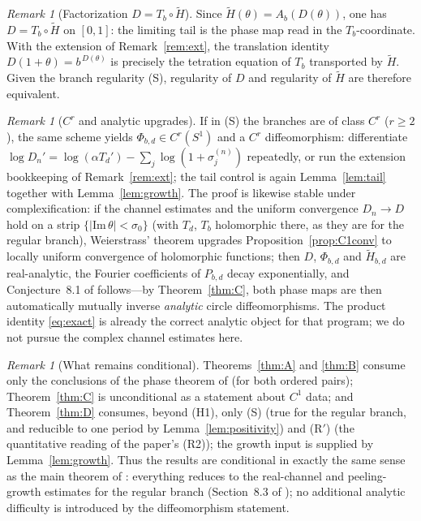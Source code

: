 \documentclass[11pt]{article}
\theoremstyle{definition}
\theoremstyle{remark}
\newtheorem{remark}[theorem]{Remark}
\newcommand{\Sone}{S^{1}}
\newcommand{\Ab}{A_{b}}
\newcommand{\Tb}{T_{b}}
\newcommand{\Td}{T_{d}}
\newcommand{\Ht}{\widetilde H}
\begin{document}
\begin{remark}[Factorization $D=\Tb\circ\Ht$]\label{rem:factor}
Since $\Ht(\theta)=\Ab(D(\theta))$, one has $D=\Tb\circ\Ht$ on $[0,1]$:
the limiting tail is the phase map read in the $\Tb$-coordinate. With the
extension of Remark~\ref{rem:ext}, the translation identity
$D(1+\theta)=b^{\,D(\theta)}$ is precisely the tetration equation of
$\Tb$ transported by $\Ht$. Given the branch regularity (S), regularity
of $D$ and regularity of $\Ht$ are therefore equivalent.
\end{remark}

\begin{remark}[$C^{r}$ and analytic upgrades]\label{rem:Cr}
If in (S) the branches are of class $C^{r}$ ($r\ge2$), the same scheme
yields $\Phi_{b,d}\in C^{r}(\Sone)$ and a $C^{r}$ diffeomorphism:
differentiate
$\log D_n'=\log(\alpha\Td')-\sum_j\log(1+\sigma_j^{(n)})$ repeatedly, or
run the extension bookkeeping of Remark~\ref{rem:ext}; the tail control
is again Lemma~\ref{lem:tail} together with Lemma~\ref{lem:growth}. The
proof is likewise stable under complexification: if the channel
estimates and the uniform convergence $D_n\to D$ hold on a strip
$\{|\mathrm{Im}\,\theta|<\sigma_0\}$ (with $\Td$, $\Tb$ holomorphic
there, as they are for the regular branch), Weierstrass' theorem upgrades
Proposition~\ref{prop:C1conv} to locally uniform convergence of
holomorphic functions; then $D$, $\Phi_{b,d}$ and $\Ht_{b,d}$ are
real-analytic, the Fourier coefficients of $P_{b,d}$ decay exponentially,
and Conjecture~8.1 of \cite{J} follows---by Theorem~\ref{thm:C}, both
phase maps are then automatically mutually inverse \emph{analytic} circle
diffeomorphisms. The product identity \eqref{eq:exact} is already the
correct analytic object for that program; we do not pursue the complex
channel estimates here.
\end{remark}

\begin{remark}[What remains conditional]\label{rem:conditional}
Theorems~\ref{thm:A} and \ref{thm:B} consume only the conclusions of the
phase theorem of \cite{J} (for both ordered pairs); Theorem~\ref{thm:C}
is unconditional as a statement about $C^{1}$ data; and
Theorem~\ref{thm:D} consumes, beyond (H1), only (S) (true for the
regular branch, and reducible to one period by
Lemma~\ref{lem:positivity}) and (R$'$) (the quantitative reading of the
paper's (R2)); the growth input is supplied by Lemma~\ref{lem:growth}.
Thus the results are conditional in exactly the same sense as the main
theorem of \cite{J}: everything reduces to the real-channel and
peeling-growth estimates for the regular branch (Section~8.3 of
\cite{J}); no additional analytic difficulty is introduced by the
diffeomorphism statement.
\end{remark}
\end{document}
